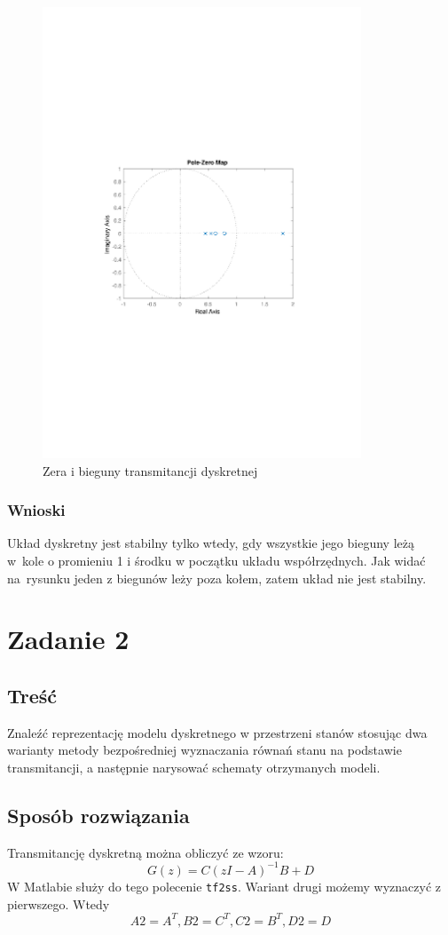 \documentclass{article}
\begin{document}
\begin{figure}[H]
\centering
\includegraphics[clip, trim=3cm 9cm 3cm 9.5cm, width=9.5cm]{../rys/rys2.pdf}
\caption{Zera i bieguny transmitancji dyskretnej}
\label{fig:rys 2}
\end{figure}

\subsubsection{Wnioski}
Układ dyskretny jest stabilny tylko wtedy, gdy wszystkie jego bieguny leżą w~kole o promieniu 1 i środku w początku układu współrzędnych. Jak widać na~rysunku jeden z biegunów leży poza kołem, zatem układ nie jest stabilny.
\section{Zadanie 2}
\subsection{Treść}
Znaleźć reprezentację modelu dyskretnego w przestrzeni stanów stosując dwa warianty
metody bezpośredniej wyznaczania równań stanu na podstawie transmitancji, a następnie
narysować schematy otrzymanych modeli.
\subsection{Sposób rozwiązania}
Transmitancję dyskretną można obliczyć ze wzoru:
$$
G(z)=C(zI-A)^{-1}B+D
$$
W Matlabie służy do tego polecenie \verb+tf2ss+.
Wariant drugi możemy wyznaczyć z pierwszego.
Wtedy
$$
A2=A^T, B2=C^T, C2=B^T, D2=D
$$
\end{document}
